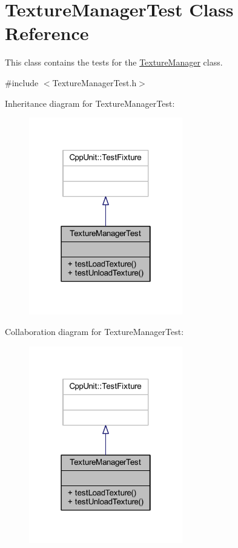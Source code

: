 \hypertarget{class_texture_manager_test}{\section{Texture\+Manager\+Test Class Reference}
\label{class_texture_manager_test}
}


This class contains the tests for the \hyperlink{class_texture_manager}{Texture\+Manager} class.  




{\ttfamily \#include $<$Texture\+Manager\+Test.\+h$>$}



Inheritance diagram for Texture\+Manager\+Test\+:\nopagebreak
\begin{figure}[H]
\begin{center}
\leavevmode
\includegraphics[width=190pt]{class_texture_manager_test__inherit__graph}
\end{center}
\end{figure}


Collaboration diagram for Texture\+Manager\+Test\+:\nopagebreak
\begin{figure}[H]
\begin{center}
\leavevmode
\includegraphics[width=190pt]{class_texture_manager_test__coll__graph}
\end{center}
\end{figure}

